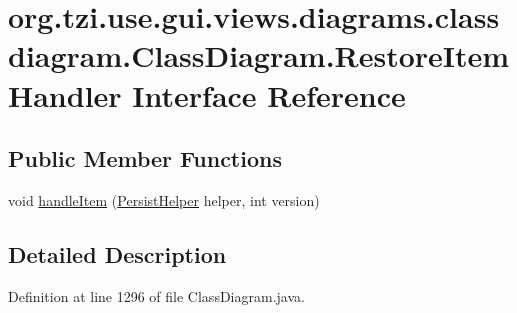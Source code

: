 \hypertarget{interfaceorg_1_1tzi_1_1use_1_1gui_1_1views_1_1diagrams_1_1classdiagram_1_1_class_diagram_1_1_restore_item_handler}{\section{org.\-tzi.\-use.\-gui.\-views.\-diagrams.\-classdiagram.\-Class\-Diagram.\-Restore\-Item\-Handler Interface Reference}
\label{interfaceorg_1_1tzi_1_1use_1_1gui_1_1views_1_1diagrams_1_1classdiagram_1_1_class_diagram_1_1_restore_item_handler}
}
\subsection*{Public Member Functions}
\begin{DoxyCompactItemize}
\item 
void \hyperlink{interfaceorg_1_1tzi_1_1use_1_1gui_1_1views_1_1diagrams_1_1classdiagram_1_1_class_diagram_1_1_restore_item_handler_ae2974b8ef5c50c83ae44699da4ab9799}{handle\-Item} (\hyperlink{classorg_1_1tzi_1_1use_1_1gui_1_1util_1_1_persist_helper}{Persist\-Helper} helper, int version)
\end{DoxyCompactItemize}


\subsection{Detailed Description}


Definition at line 1296 of file Class\-Diagram.\-java.



